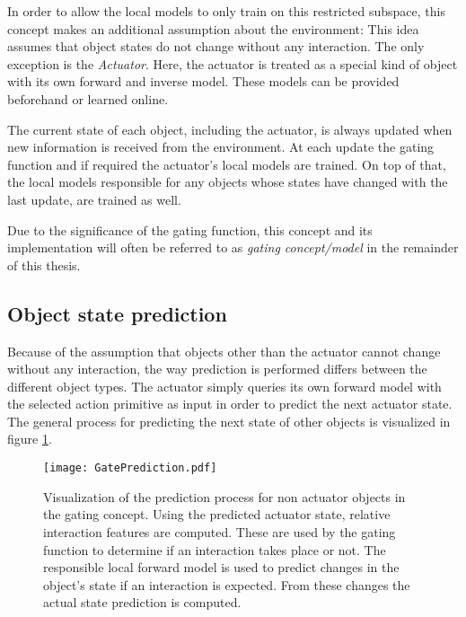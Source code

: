 In order to allow the local models to only train on this restricted subspace, this concept makes an additional assumption about the environment: 
This idea assumes that object states do not change without any interaction. The only exception is the \textit{Actuator}. Here, the actuator is treated as a special kind of object with its own forward and inverse model. These models can be provided beforehand or learned online.  

The current state of each object, including the actuator, is always updated when new information is received from the environment. At each update the gating function and if required the actuator's local models are trained. On top of that, the local models responsible for any objects whose states have changed with the last update, are trained as well. 

Due to the significance of the gating function, this concept and its implementation will often be referred to as \textit{gating concept/model} in the remainder of this thesis.



\subsection{Object state prediction \label{sec:gatePrediction}}

Because of the assumption that objects other than the actuator cannot change without any interaction, the way prediction is performed differs between the different object types. The actuator simply queries its own forward model with the selected action primitive as input in order to predict the next actuator state. 
The general process for predicting the next state of other objects is visualized in figure \ref{fig:GatePrediction}.

\begin{figure}[h]
	\centering
	\texttt{[image: GatePrediction.pdf]}
	\caption{Visualization of the prediction process for non actuator objects in the gating concept. Using the predicted actuator state, relative interaction features are computed. These are used by the gating function to determine if an interaction takes place or not. The responsible local forward model is used to predict 
	changes in the object's state if an interaction is expected. From these changes the actual state prediction is computed.} 
	\label{fig:GatePrediction}
\end{figure}


